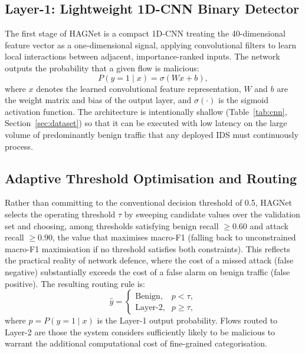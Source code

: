 \documentclass{llncs}
\begin{document}
\subsection{Layer-1: Lightweight 1D-CNN Binary Detector}

The first stage of HAGNet is a compact 1D-CNN treating the 40-dimensional feature vector as a one-dimensional signal, applying convolutional filters to learn local interactions between adjacent, importance-ranked inputs. The network outputs the probability that a given flow is malicious:
\begin{equation}
P(y=1 \mid x) = \sigma(Wx + b),
\label{eq:binary}
\end{equation}
where $x$ denotes the learned convolutional feature representation, $W$ and $b$ are the weight matrix and bias of the output layer, and $\sigma(\cdot)$ is the sigmoid activation function. The architecture is intentionally shallow (Table~\ref{tab:cnn}, Section~\ref{sec:dataset}) so that it can be executed with low latency on the large volume of predominantly benign traffic that any deployed IDS must continuously process.

\subsection{Adaptive Threshold Optimisation and Routing}

Rather than committing to the conventional decision threshold of 0.5, HAGNet selects the operating threshold $\tau$ by sweeping candidate values over the validation set and choosing, among thresholds satisfying benign recall $\geq 0.60$ and attack recall $\geq 0.90$, the value that maximises macro-F1 (falling back to unconstrained macro-F1 maximisation if no threshold satisfies both constraints). This reflects the practical reality of network defence, where the cost of a missed attack (false negative) substantially exceeds the cost of a false alarm on benign traffic (false positive). The resulting routing rule is:
\begin{equation}
\hat{y} =
\begin{cases}
\text{Benign}, & p < \tau, \\
\text{Layer-2}, & p \geq \tau,
\end{cases}
\label{eq:routing}
\end{equation}
where $p = P(y=1\mid x)$ is the Layer-1 output probability. Flows routed to Layer-2 are those the system considers sufficiently likely to be malicious to warrant the additional computational cost of fine-grained categorisation.
\end{document}
